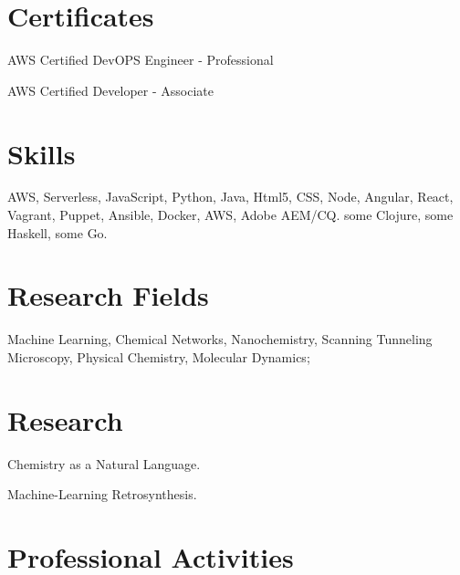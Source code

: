 \documentclass[11pt,letterpaper]{article}
\renewenvironment{itemize}{
  \begin{list}{}{
    \setlength{\leftmargin}{1.5em}
  }
}{
  \end{list}
}
\begin{document}
\section*{Certificates}
\begin{itemize}
  \item  AWS Certified DevOPS Engineer - Professional
  \item  AWS Certified Developer - Associate
\end{itemize}



\section*{Skills}

\begin{itemize}
  \item  AWS, Serverless, JavaScript, Python, Java, Html5, CSS, Node, Angular, React, Vagrant, Puppet, Ansible, Docker, AWS, Adobe AEM/CQ. some Clojure, some Haskell, some Go.
\end{itemize}

\section*{Research Fields}
Machine Learning, Chemical Networks, Nanochemistry, Scanning Tunneling Microscopy, Physical Chemistry, Molecular Dynamics;

\section*{Research}

\begin{itemize}
\item Chemistry as a Natural Language.
\item Machine-Learning Retrosynthesis.
\end{itemize}


\section*{Professional Activities}
\end{document}
